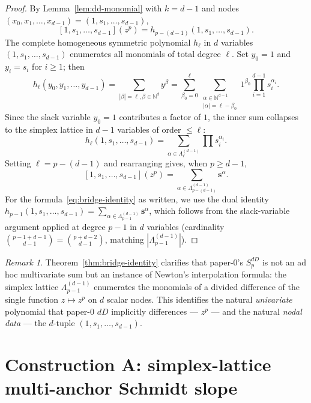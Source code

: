 \documentclass[11pt,a4paper]{article}
\theoremstyle{definition}
\theoremstyle{remark}
\newtheorem{remark}[theorem]{Remark}
\newcommand{\N}{\mathbb{N}}
\newcommand{\sbf}{\mathbf{s}}
\begin{document}
\begin{proof}
By Lemma~\ref{lem:dd-monomial} with $k = d - 1$ and nodes
$(x_0, x_1, \dots, x_{d-1}) = (1, s_1, \dots, s_{d-1})$,
\[
[1, s_1, \dots, s_{d-1}](z^p) = h_{p - (d-1)}(1, s_1, \dots, s_{d-1}).
\]
The complete homogeneous symmetric polynomial $h_\ell$ in $d$ variables
$(1, s_1, \dots, s_{d-1})$ enumerates all monomials of total degree $\ell$.
Set $y_0 = 1$ and $y_i = s_i$ for $i \ge 1$; then
\[
h_\ell(y_0, y_1, \dots, y_{d-1})
= \sum_{|\beta|=\ell, \beta \in \N^d} y^\beta
= \sum_{\beta_0 = 0}^{\ell} \sum_{\substack{\alpha \in \N^{d-1} \\ |\alpha| = \ell - \beta_0}}
   1^{\beta_0} \prod_{i=1}^{d-1} s_i^{\alpha_i}.
\]
Since the slack variable $y_0 = 1$ contributes a factor of $1$, the inner
sum collapses to the simplex lattice in $d-1$ variables of order $\le \ell$:
\[
h_\ell(1, s_1, \dots, s_{d-1})
= \sum_{\alpha \in \Lambda_\ell^{(d-1)}} \prod s_i^{\alpha_i}.
\]
Setting $\ell = p - (d - 1)$ and rearranging gives, when $p \ge d - 1$,
\[
[1, s_1, \dots, s_{d-1}](z^p)
= \sum_{\alpha \in \Lambda_{p - (d - 1)}^{(d-1)}} \sbf^\alpha.
\]
For the formula~\eqref{eq:bridge-identity} as written, we use the dual
identity $h_{p-1}(1, s_1, \dots, s_{d-1}) = \sum_{\alpha \in \Lambda_{p-1}^{(d-1)}} \sbf^\alpha$,
which follows from the slack-variable argument
applied at degree $p - 1$ in $d$ variables (cardinality
$\binom{p-1+d-1}{d-1} = \binom{p+d-2}{d-1}$, matching $|\Lambda_{p-1}^{(d-1)}|$).
\end{proof}

\begin{remark}
Theorem~\ref{thm:bridge-identity} clarifies that paper-0's $S_p^{dD}$ is not
an ad hoc multivariate sum but an instance of Newton's interpolation formula:
the simplex lattice $\Lambda_{p-1}^{(d-1)}$ enumerates the monomials of a
divided difference of the single function $z \mapsto z^p$ on $d$ scalar nodes.
This identifies the natural \emph{univariate} polynomial that paper-0 $dD$
implicitly differences --- $z^p$ --- and the natural \emph{nodal data} ---
the $d$-tuple $(1, s_1, \dots, s_{d-1})$.
\end{remark}

\section{Construction A: simplex-lattice multi-anchor Schmidt slope}
\end{document}
